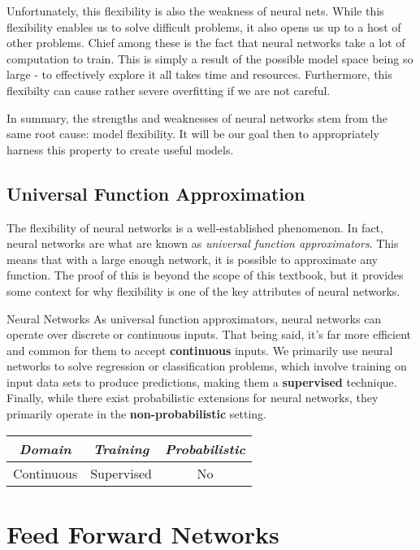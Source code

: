 Unfortunately, this flexibility is also the weakness of neural nets. While this flexibility enables us to solve difficult problems, it also opens us up to a host of other problems. Chief among these is the fact that neural networks take a lot of computation to train. This is simply a result of the possible model space being so large - to effectively explore it all takes time and resources. Furthermore, this flexibilty can cause rather severe overfitting if we are not careful.

In summary, the strengths and weaknesses of neural networks stem from the same root cause: model flexibility. It will be our goal then to appropriately harness this property to create useful models.

\subsection{Universal Function Approximation}
The flexibility of neural networks is a well-established phenomenon. In fact, neural networks are what are known as \textit{universal function approximators}. This means that with a large enough network, it is possible to approximate any function. The proof of this is beyond the scope of this textbook, but it provides some context for why flexibility is one of the key attributes of neural networks.

\begin{mlcube}{Neural Networks}
As universal function approximators, neural networks can operate over discrete or continuous inputs. That being said, it's far more efficient and common for them to accept \textbf{continuous} inputs. We primarily use neural networks to solve regression or classification problems, which involve training on input data sets to produce predictions, making them a \textbf{supervised} technique. Finally, while there exist probabilistic extensions for neural networks, they primarily operate in the \textbf{non-probabilistic} setting.
\begin{center}
    \begin{tabular}{c|c|c}
    \textit{\textbf{Domain}} & \textit{\textbf{Training}} & \textit{\textbf{Probabilistic}} \\
    \hline
    Continuous & Supervised & No \\
    \end{tabular}
\end{center}
\end{mlcube}

\section{Feed Forward Networks}